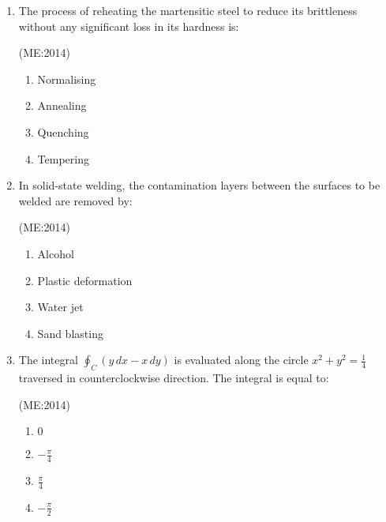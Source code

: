 \documentclass[journal,12pt,onecolumn]{IEEEtran}
\theoremstyle{remark}
\begin{document}
\begin{enumerate}
    \item
	    The process of reheating the martensitic steel to reduce its brittleness without any significant loss in its hardness is: 

	    \hfill{(ME:2014)}
    \begin{multicols}{4}
    \begin{enumerate}
        \item Normalising
        \item Annealing
        \item Quenching
        \item Tempering
    \end{enumerate}
    \end{multicols}

    \item In solid-state welding, the contamination layers between the surfaces to be welded are removed by:

	    \hfill{(ME:2014)}
    \begin{multicols}{4}
    \begin{enumerate}
        \item Alcohol
        \item Plastic deformation
        \item Water jet
        \item Sand blasting
    \end{enumerate}
    \end{multicols}

    \item The integral $\oint_C (y \, dx - x \, dy)$ is evaluated along the circle $x^2 + y^2 = \frac{1}{4}$ traversed in counterclockwise direction. The integral is equal to: 

	    \hfill{(ME:2014)}
    \begin{multicols}{4}
    \begin{enumerate}
        \item $0$
	\item $-\frac{\pi}{4}$
	\item $\frac{ \pi}{4}$
	\item $-\frac{ \pi}{2}$
    \end{enumerate}
    \end{multicols}

   \end{enumerate}
\end{document}
